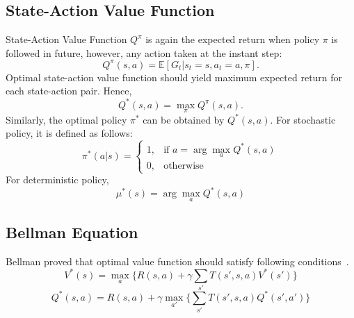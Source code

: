 \subsection{State-Action Value Function}

State-Action Value Function $Q^{\pi}$ is again the expected return when policy $\pi$ is followed in future, 
however, any action taken at the instant step:
\begin{equation}
Q^{\pi}(s,a) = \mathbb{E}[G_t|s_t=s, a_t=a, \pi]. %
\end{equation}
Optimal state-action value function should yield maximum expected return for each state-action pair. Hence,
\begin{equation}
Q^{*}(s,a) = \max_{\pi} Q^{\pi}(s,a).
\end{equation}
Similarly, the optimal policy $\pi^*$ can be obtained by $Q^{*}(s,a)$. For stochastic policy, it is defined as follows: 
\begin{equation}
\label{eqn:policy_stochastic_q}
\pi^{*}(a|s) = 
\begin{cases}
1,   & \text{if  } a = \arg\max_{a} Q^{*}(s,a) \\
0,   & \text{otherwise  }
\end{cases} 
\end{equation}
For deterministic policy, 
\begin{equation}
\label{eqn:policy_deterministic_q}
\mu^{*}(s) = \arg\max_{a} Q^{*}(s,a)
\end{equation}

\subsection{Bellman Equation}

Bellman proved that optimal value function should satisfy following conditions~\cite{bellman_dynamic_2003}. 
\begin{equation}
\label{eqn:bellman_v}
V^{*}(s) = \max_{a} \Big\{ R(s,a) + \gamma \sum_{s'} T(s',s,a) V^{*}(s') \Big\}
\end{equation}
\begin{equation}
\label{eqn:bellman_q}
Q^{*}(s,a) = R(s,a) + \gamma \max_{a'} \Big\{ \sum_{s'} T(s',s,a) Q^{*}(s',a') \Big\}
\end{equation}
